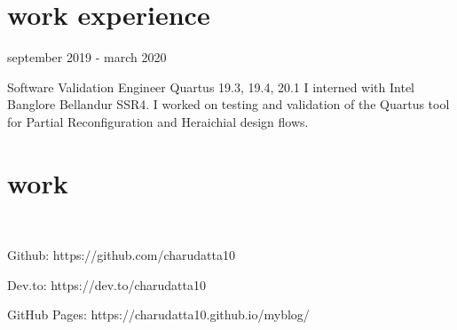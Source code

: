 \documentclass[fontsize=11pt]{tccv}
\begin{document}
\section{work experience}
\begin{fromto}
\item{september 2019 - march 2020}
\end{fromto}
\begin{project}
	\item{Software Validation Engineer}
	{Quartus 19.3, 19.4, 20.1}
	{I interned with Intel Banglore Bellandur SSR4. I worked on testing and validation of the Quartus tool for Partial Reconfiguration and Heraichial design flows.  }
\end{project}
\vspace{1em}

\section{work}
\begin{skills}\\
\item {Github: https://github.com/charudatta10}\\
\item {Dev.to: https://dev.to/charudatta10}\\
\item {GitHub Pages: https://charudatta10.github.io/myblog/}\\
\end{skills}
\vspace{1em}

\end{document}
